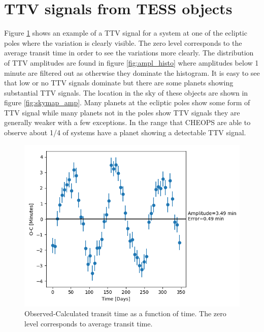\documentclass[12pt]{report}
\begin{document}
\section{TTV signals from TESS objects}
	Figure \ref{fig:TTV1} shows an example of a TTV signal for a system at one of the ecliptic poles where the variation is clearly visible. The zero level corresponds to the average transit time in order to see the variations more clearly. The distribution of TTV amplitudes are found in figure \ref{fig:ampl_histo} where amplitudes below 1 minute are filtered out as otherwise they dominate the histogram. It is easy to see that low or no TTV signals dominate but there are some planets showing substantial TTV signals. The location in the sky of these objects are shown in figure \ref{fig:skymap_amp}. Many planets at the ecliptic poles show some form of TTV signal while many planets not in the poles show TTV signals they are generally weaker with a few exceptions. In the range that CHEOPS are able to observe about 1/4 of systems have a planet showing a detectable TTV signal.
\begin{figure}[h]
 	 \centering
	  \includegraphics[width=\textwidth]{img/232_1.png}
	  \caption{Observed-Calculated transit time as a function of time. The zero level corresponds to average transit time.}
	 \label{fig:TTV1}
\end{figure}
\end{document}
